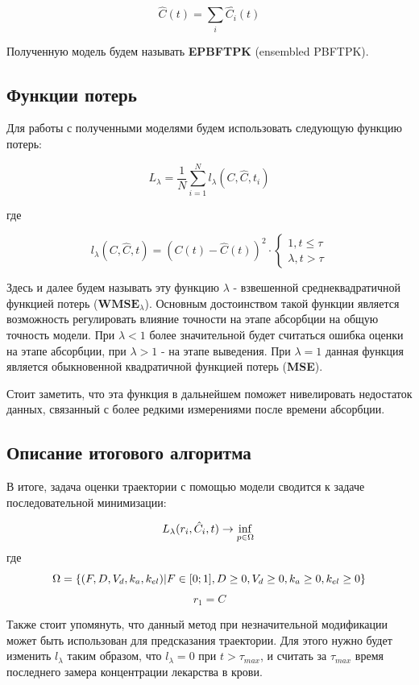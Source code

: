 \documentclass[oneside,senior,etd]{BYUPhys}
\begin{document}
\[
	\hat{C}(t) = \sum_i \hat{C_i}(t)
\]

Полученную модель будем называть \textbf{EPBFTPK} (ensembled PBFTPK).

\subsection{Функции потерь}

Для работы с полученными моделями будем использовать следующую функцию потерь:

\[
	L_{\lambda} = \frac{1}{N} \sum_{i=1}^{N} l_{\lambda}(C, \hat{C}, t_i)
\]

где

\[
	l_{\lambda}(C, \hat{C}, t) = (C(t) - \hat{C}(t)) ^ 2 \cdot \begin{cases}
		1, t \leq \tau \\
		\lambda, t > \tau
	\end{cases}
\]

Здесь и далее будем называть эту функцию $\lambda$ - взвешенной среднеквадратичной функцией потерь ($\textbf{WMSE}_{\lambda}$). Основным достоинством такой функции является возможность регулировать влияние точности на этапе абсорбции на общую точность модели. При $\lambda < 1$ более значительной будет считаться ошибка оценки на этапе абсорбции, при $\lambda > 1$ - на этапе выведения. При $\lambda = 1$ данная функция является обыкновенной квадратичной функцией потерь (\textbf{MSE}).

Стоит заметить, что эта функция в дальнейшем поможет нивелировать недостаток данных, связанный с более редкими измерениями после времени абсорбции.

\subsection{Описание итогового алгоритма}

В итоге, задача оценки траектории с помощью модели сводится к задаче последовательной минимизации:


\[
	L_{\lambda}(r_i, \hat{C}_i, t) \rightarrow \inf_{p \in \Omega}                                          \\
\]
где
\[
	\Omega = \{ (F, D, V_d, k_a, k_{el}) | F \in [0; 1], D \geq 0, V_d \geq 0, k_a \geq 0, k_{el} \geq 0 \} \\
\]
\[
	r_1 = C
\]

Также стоит упомянуть, что данный метод при незначительной модификации может быть использован для предсказания траектории. Для этого нужно будет изменить $l_{\lambda}$ таким образом, что $l_{\lambda} = 0$ при $t > \tau_{max}$, и считать за $\tau_{max}$ время последнего замера концентрации лекарства в крови.
\end{document}

